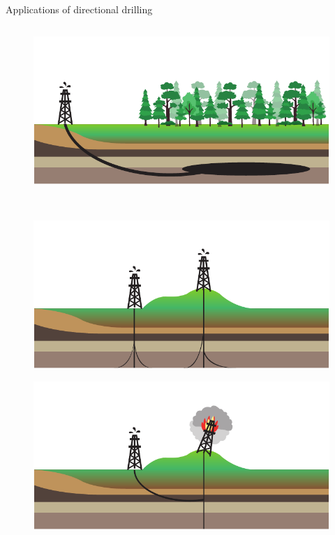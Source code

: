 \documentclass{beamer}
\begin{document}
\begin{frame}{Applications of directional drilling}	
	\begin{columns}
	\hspace{0.9cm}\begin{column}{0.4\textwidth}
	\begin{figure}[t]
		\centering
		\begin{minipage}[t]{1\textwidth}
			\centering
			\includegraphics[width=1\linewidth]{images/appdd1.pdf}\\
		\end{minipage}%
		\\\begin{minipage}[t]{1\textwidth}
			\centering
			\includegraphics[width=1\linewidth]{images/appdd2.pdf}\\
		\end{minipage}
		\begin{minipage}[t]{1\textwidth}
			\centering
			\includegraphics[width=1\linewidth]{images/appdd3.pdf}\\

\end{minipage}
\end{figure}
\end{column}
\end{columns}
\end{frame}
\end{document}
